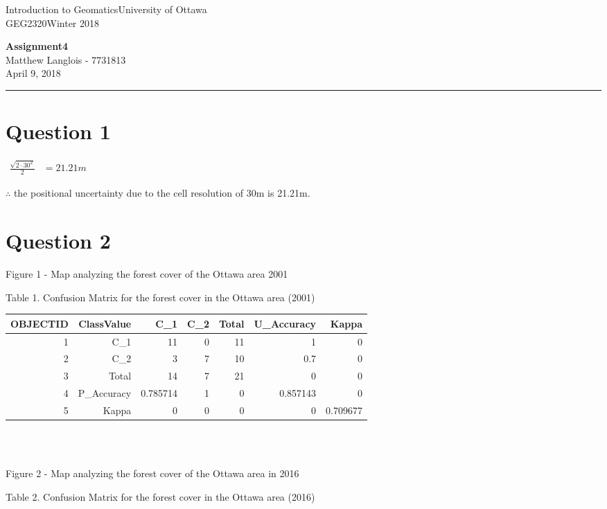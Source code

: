 \documentclass[fleqn, 12pt]{article}
\newcommand{\university}{University of Ottawa}
\newcommand{\name}{Matthew Langlois}
\newcommand{\studentNumber}{7731813}
\newcommand{\semester}{Winter 2018}
\newcommand{\assignmentType}{Assignment}
\newcommand{\assignmentNumber}{4}
\newcommand{\dueDate}{April 9, 2018}
\newcommand{\courseCode}{GEG2320}
\newcommand{\courseTitle}{Introduction to Geomatics}
\newcommand{\beginassignment}{
    \newlength\tindent
    \setlength{\tindent}{\parindent}
    \setlength{\parindent}{0pt}

    \thispagestyle{assignment}
    \noindent
    \courseTitle \hfill \university\\
    \courseCode \hfill \semester
    \begin{center}
        \textbf{\assignmentType\text{ }\ifdefempty{\assignmentNumber}{}{\#}\assignmentNumber}\\
        \name \hspace{1pt} - \studentNumber\\
        \dueDate\\
    \end{center}
    \vspace{6pt}
    \hrule
    \vspace{1.5\headsep}
}
\begin{document}
\beginassignment


\section*{Question 1}

$
    \begin{aligned}
        \frac{\sqrt{2 \cdot 30^2}}{2} &= 21.21m
    \end{aligned}
$

$\therefore$ the positional uncertainty due to the cell resolution of 30m is 21.21m.

\section*{Question 2}

\begin{center}
    Figure 1 - Map analyzing the forest cover of the Ottawa area 2001
\end{center}

\newpage

Table 1. Confusion Matrix for the forest cover in the Ottawa area (2001)\\

\begin{tabular}{rrrrrrr}
    \hline
        OBJECTID & ClassValue & C\_1 & C\_2 & Total & U\_Accuracy & Kappa \\\hline
        1 & C\_1 & 11 & 0 & 11 & 1 & 0 \\
        2 & C\_2 & 3 & 7 & 10 & 0.7 & 0\\
        3 & Total & 14 & 7 & 21 & 0 & 0\\
        4 & P\_Accuracy & 0.785714 & 1 & 0 & 0.857143 & 0\\
        5 & Kappa & 0 & 0 & 0 & 0 & 0.709677\\
    \hline

\end{tabular}\\\\

\begin{center}
    Figure 2 - Map analyzing the forest cover of the Ottawa area in 2016
\end{center}

Table 2. Confusion Matrix for the forest cover in the Ottawa area (2016)\\
\end{document}
